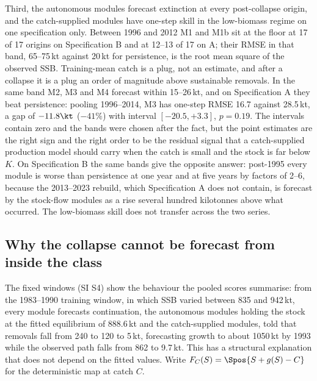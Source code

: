 Third, the autonomous modules forecast extinction at every post-collapse origin, and the catch-supplied modules have one-step skill in the low-biomass regime on one specification only. Between 1996 and 2012 M1 and M1b sit at the floor at 17 of 17 origins on Specification B and at 12--13 of 17 on A; their RMSE in that band, 65--75\,kt against 20\,kt for persistence, is the root mean square of the observed SSB. Training-mean catch is a plug, not an estimate, and after a collapse it is a plug an order of magnitude above sustainable removals. In the same band M2, M3 and M4 forecast within 15--26\,kt, and on Specification A they beat persistence: pooling 1996--2014, M3 has one-step RMSE 16.7 against 28.5\,kt, a gap of $-11.8\kt$ ($-41\%$) with interval $[-20.5,+3.3]$, $p=0.19$. The intervals contain zero and the bands were chosen after the fact, but the point estimates are the right sign and the right order to be the residual signal that a catch-supplied production model should carry when the catch is small and the stock is far below $K$. On Specification B the same bands give the opposite answer: post-1995 every module is worse than persistence at one year and at five years by factors of 2--6, because the 2013--2023 rebuild, which Specification A does not contain, is forecast by the stock-flow modules as a rise several hundred kilotonnes above what occurred. The low-biomass skill does not transfer across the two series.

\FloatBarrier
\subsection{Why the collapse cannot be forecast from inside the class}\label{sec:identification}

The fixed windows (SI S4) show the behaviour the pooled scores summarise: from the 1983--1990 training window, in which SSB varied between 835 and 942\,kt, every module forecasts continuation, the autonomous modules holding the stock at the fitted equilibrium of 888.6\,kt and the catch-supplied modules, told that removals fall from 240 to 120 to 5\,kt, forecasting growth to about 1050\,kt by 1993 while the observed path falls from 862 to 9.7\,kt. This has a structural explanation that does not depend on the fitted values. Write $F_C(S) = \Spos{S + g(S) - C}$ for the deterministic map at catch $C$.

